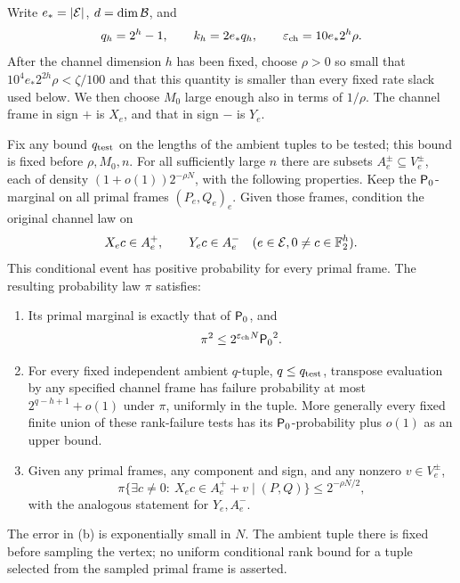 Write \(e_* = |\mathcal E|\), \(d=\dim\mathcal B\), and
\[
 q_h=2^h-1,\qquad k_h=2e_*q_h,\qquad
 \varepsilon_{\rm ch}=10e_*2^h\rho.
\]
After the channel dimension \(h\) has been fixed, choose \(\rho>0\) so small
that \(10^4e_*2^{2h}\rho<\zeta/100\) and that this quantity is smaller than
every fixed rate slack used below.  We then choose \(M_0\) large enough
also in terms of \(1/\rho\).  The channel frame in sign \(+\) is \(X_e\),
and that in sign \(-\) is \(Y_e\).

\begin{lemma}\label{lem:channel-thinning}
Fix any bound \(q_{\rm test}\) on the lengths of the ambient tuples to be tested;
this bound is fixed before \(\rho,M_0,n\).  For all sufficiently large \(n\)
there are subsets \(A_e^\pm\subseteq V_e^\pm\), each of density
\((1+o(1))2^{-\rho N}\), with the following properties.
Keep the \({\mathsf P_0}\)-marginal on all primal frames \((P_e,Q_e)_e\).
Given those frames, condition the original channel law on
\begin{equation}\label{eq:channel-allowed}
 X_e c\in A_e^+,\qquad Y_e c\in A_e^-
 \quad(e\in\mathcal E, 0\ne c\in\mathbb F_2^h).
\end{equation}
This conditional event has positive probability for every primal frame.
The resulting probability law \(\pi\) satisfies:
\begin{enumerate}[label=\textup{(\alph*)}]
\item Its primal marginal is exactly that of \({\mathsf P_0}\), and
\begin{equation}\label{eq:thinning-density}
 \pi^2\le 2^{\varepsilon_{\rm ch}N}{\mathsf P_0}^2.
\end{equation}
\item For every fixed independent ambient \(q\)-tuple, \(q\le q_{\rm test}\),
transpose evaluation by any specified channel frame has failure probability
at most \(2^{q-h+1}+o(1)\) under \(\pi\), uniformly in the tuple.
More generally every fixed finite union of these rank-failure tests has its
\({\mathsf P_0}\)-probability plus \(o(1)\) as an upper bound.
\item Given any primal frames, any component and sign, and any nonzero
\(v\in V_e^\pm\),
\begin{equation}\label{eq:channel-translate}
 \pi\bigl\{\exists c\ne0:\ X_ec\in A_e^++v
              \mid(P,Q)\bigr\}\le2^{-\rho N/2},
\end{equation}
with the analogous statement for \(Y_e,A_e^-\).
\end{enumerate}
The error in \textup{(b)} is exponentially small in \(N\).
The ambient tuple there is fixed before sampling the vertex; no uniform
conditional rank bound for a tuple selected from the sampled primal frame
is asserted.
\end{lemma}
